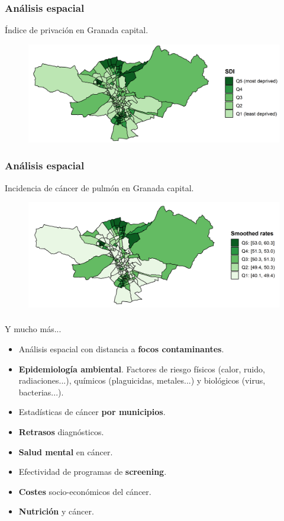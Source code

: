 \documentclass{beamer}
\begin{document}

\begin{frame}\frametitle{Análisis espacial}
	\centering Índice de privación en Granada capital.
	\begin{figure}
		\centering
		\includegraphics[width=.9\textwidth]{images/maps_DI_zoom.png}
	\end{figure}
\end{frame}


\begin{frame}\frametitle{Análisis espacial}
	\centering Incidencia de cáncer de pulmón en Granada capital.
	\begin{figure}
		\centering
		\includegraphics[width=.9\textwidth]{images/03_lung_ebs_zoom.png}
	\end{figure}
\end{frame}


\begin{frame}\frametitle{}
	\begin{block}{Y mucho más...}
		\begin{itemize}
			\item Análisis espacial con distancia a \textbf{focos contaminantes}.
			\item \textbf{Epidemiología ambiental}. Factores de riesgo físicos (calor, ruido, radiaciones...), químicos (plaguicidas, metales...) y biológicos (virus, bacterias...).
			\item Estadísticas de cáncer \textbf{por municipios}.
			\item \textbf{Retrasos} diagnósticos.
			\item \textbf{Salud mental} en cáncer.
			\item Efectividad de programas de \textbf{screening}.
			\item \textbf{Costes} socio-económicos del cáncer.
			\item \textbf{Nutrición} y cáncer.
		\end{itemize}
	\end{block}
\end{frame}
\end{document}
